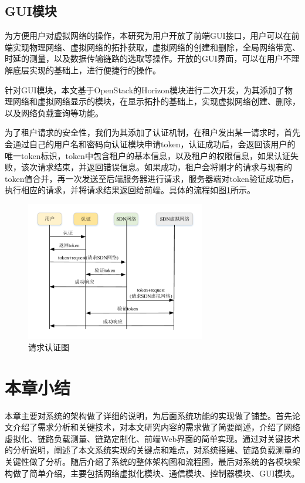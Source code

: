 \subsection{GUI模块}
为方便用户对虚拟网络的操作，本研究为用户开放了前端GUI接口，用户可以在前端实现物理网络、虚拟网络的拓扑获取，虚拟网络的创建和删除，全局网络带宽、时延的测量，以及数据传输链路的选取等操作。开放的GUI界面，可以在用户不理解底层实现的基础上，进行便捷行的操作。

针对GUI模块，本文基于OpenStack的Horizon模块进行二次开发，为其添加了物理网络和虚拟网络显示的模块，在显示拓扑的基础上，实现虚拟网络创建、删除，以及网络负载查询等功能。

为了租户请求的安全性，我们为其添加了认证机制，在租户发出某一请求时，首先会通过自己的用户名和密码向认证模块申请token，认证成功后，会返回该用户的唯一token标识，token中包含租户的基本信息，以及租户的权限信息，如果认证失败，该次请求结束，并返回错误信息。如果成功，租户会将刚才的请求与现有的token值合并，再一次发送至后端服务器进行请求，服务器端对token验证成功后，执行相应的请求，并将请求结果返回给前端。具体的流程如图\ref{fig:credentials}所示。

\begin{figure}[!htb]
  \centering
  \includegraphics[width=0.7\textwidth]{logo/credentials}
  \caption{请求认证图}
  \label{fig:credentials}
\end{figure}

\section{本章小结}
本章主要对系统的架构做了详细的说明，为后面系统功能的实现做了铺垫。首先论文介绍了需求分析和关键技术，对本文研究内容的需求做了简要阐述，介绍了网络虚拟化、链路负载测量、链路定制化、前端Web界面的简单实现。通过对关键技术的分析说明，阐述了本文系统实现的关键点和难点，对系统搭建、链路负载测量的关键性做了分析。随后介绍了系统的整体架构图和流程图，最后对系统的各模块架构做了简单介绍，主要包括网络虚拟化模块、通信模块、控制器模块、GUI模块。
